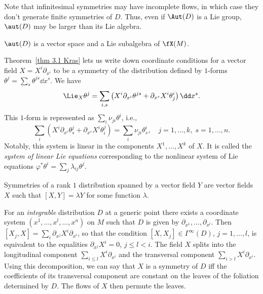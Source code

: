 Note that infinitesimal symmetries may have incomplete flows, in which case they don't generate finite symmetries of $D$. Thus, even if $\Aut(D)$ is a Lie group, $\aut(D)$ may be larger than its Lie algebra.

\begin{cor}\label{cor 3.2 Kras}
    $\aut(D)$ is a vector space and a Lie subalgebra of $\fX(M)$.
\end{cor}

Theorem~\ref{thm 3.1 Kras} lets us write down coordinate conditions for a vector field $X=X^i\partial_{x^i}$ to be a symmetry of the distribution defined by $1$-forms $\theta^j=\sum_s\theta^{js}\dd x^s$.  We have 
\[\Lie_X\theta^j=\sum_{i,s}\left(X^i\partial_{x^i}\theta^{js}+\partial_{x^s}X^i \theta^{i}_j\right)\dd x^s.\]
This $1$-form is represented as $\sum_i\nu_{ji}\theta^i$, i.e., 
\[\sum_{i}\left(X^i\partial_{x^i}\theta^{j}_s+\partial_{x^s}X^i \theta^{j}_i\right)=\sum_i\nu_{ji}\theta^{i}_s,\quad j=1,\ldots,k,\; s=1,\ldots,n.\]
Notably, this system is linear in the components $X^1,\ldots,X^k$ of $X$. It is called the \emph{system of linear Lie equations} corresponding to the nonlinear system of Lie equations $\varphi^\ast\theta^i=\sum_j\lambda_{ij}\theta^j$.

\begin{example}
    Symmetries of a rank $1$ distribution spanned by a vector field $Y$ are vector fields $X$ such that $[X,Y]=\lambda Y$ for some function $\lambda$.
\end{example}

\begin{example}
    For an \emph{integrable} distribution $D$ at a generic point there exists a coordinate system $(x^1,\ldots,x^l,\ldots,x^n)$ on $M$ such that $D$ is given by $\partial_{x^1},\ldots,\partial_{x^l}$. Then $[X_j,X]=\sum_i \partial_{x^j}X^i\partial_{x^i}$, so that the condition $[X,X_j]\in \Gamma^\infty(D)$, $j=1,\ldots,l$, is equivalent to the equalities $\partial_{x^j}X^i=0$, $j\leq l<i$. The field $X$ splits into the longitudinal component $\sum_{i\leq l}X^i\partial_{x^i}$ and the transversal component $\sum_{i>l}X^i\partial_{x^i}$. Using this decomposition, we can say that $X$ is a symmetry of $D$ iff the coefficients of its transversal component are constant on the leaves of the foliation determined by $D$. The flows of $X$ then permute the leaves.
\end{example}

